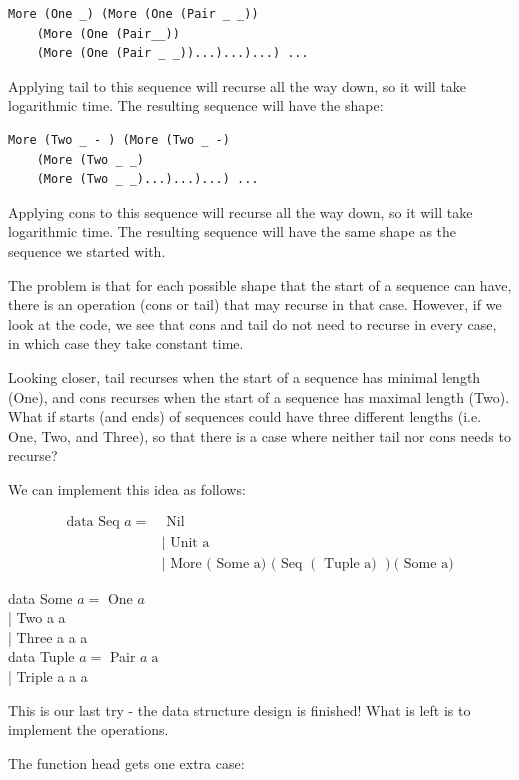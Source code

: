 \documentclass[10pt]{article}
\begin{document}
\begin{verbatim}
More (One _) (More (One (Pair _ _))
    (More (One (Pair__))
    (More (One (Pair _ _))...)...)...) ...
\end{verbatim}

Applying tail to this sequence will recurse all the way down, so it will take logarithmic time. The resulting sequence will have the shape:

\begin{verbatim}
More (Two _ - ) (More (Two _ -)
    (More (Two _ _)
    (More (Two _ _)...)...)...) ...
\end{verbatim}

Applying cons to this sequence will recurse all the way down, so it will take logarithmic time. The resulting sequence will have the same shape as the sequence we started with.

The problem is that for each possible shape that the start of a sequence can have, there is an operation (cons or tail) that may recurse in that case. However, if we look at the code, we see that cons and tail do not need to recurse in every case, in which case they take constant time.

Looking closer, tail recurses when the start of a sequence has minimal length (One), and cons recurses when the start of a sequence has maximal length (Two). What if starts (and ends) of sequences could have three different lengths (i.e. One, Two, and Three), so that there is a case where neither tail nor cons needs to recurse?

We can implement this idea as follows:

$$
\begin{aligned}
\text { data Seq } a= & \text { Nil } \\
& \mid \text { Unit a } \\
& \mid \text { More }(\text { Some a) }(\text { Seq }(\text { Tuple a) })(\text { Some a) }
\end{aligned}
$$

data Some $a=$ One $a$\\
| Two a a\\
| Three a a a\\
data Tuple $a=$ Pair $a \operatorname{a}$\\
| Triple a a a

This is our last try - the data structure design is finished! What is left is to implement the operations.

The function head gets one extra case:
\end{document}

